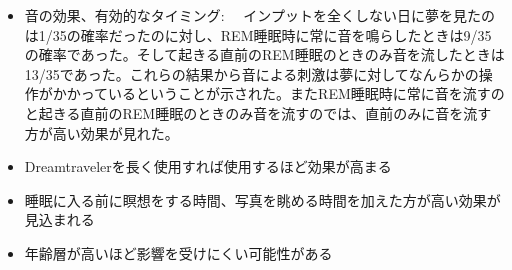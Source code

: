 \begin{itemize}
\item 音の効果、有効的なタイミング:
　インプットを全くしない日に夢を見たのは1/35の確率だったのに対し、REM睡眠時に常に音を鳴らしたときは9/35の確率であった。そして起きる直前のREM睡眠のときのみ音を流したときは13/35であった。これらの結果から音による刺激は夢に対してなんらかの操作がかかっているということが示された。またREM睡眠時に常に音を流すのと起きる直前のREM睡眠のときのみ音を流すのでは、直前のみに音を流す方が高い効果が見れた。
\item Dreamtravelerを長く使用すれば使用するほど効果が高まる
\item 睡眠に入る前に瞑想をする時間、写真を眺める時間を加えた方が高い効果が見込まれる
\item 年齢層が高いほど影響を受けにくい可能性がある
\end{itemize}